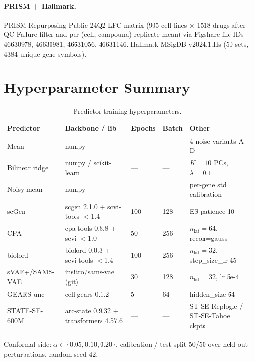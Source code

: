\documentclass{article}
\begin{document}
\paragraph{PRISM + Hallmark.} PRISM Repurposing Public 24Q2 LFC matrix (905 cell lines $\times$ 1518 drugs after QC-Failure filter and per-(cell, compound) replicate mean) via Figshare file IDs 46630978, 46630981, 46631056, 46631146. Hallmark MSigDB v2024.1.Hs (50 sets, 4384 unique gene symbols).

\section{Hyperparameter Summary}
\label{app:hparams}

\begin{table}[h]
\caption{Predictor training hyperparameters.}
\label{tab:hparams}
\centering
\small
\begin{tabular}{lllll}
\toprule
Predictor       & Backbone / lib                   & Epochs   & Batch & Other \\
\midrule
Mean            & numpy                            & ---      & ---   & 4 noise variants A--D \\
Bilinear ridge  & numpy / scikit-learn             & ---      & ---   & $K = 10$ PCs, $\lambda = 0.1$ \\
Noisy mean      & numpy                            & ---      & ---   & per-gene std calibration \\
scGen           & scgen 2.1.0 + scvi-tools $<$1.4  & 100      & 128   & ES patience 10 \\
CPA             & cpa-tools 0.8.8 + scvi $<$1.0    & 50       & 256   & $n_{\text{lat}} = 64$, recon=gauss \\
biolord         & biolord 0.0.3 + scvi-tools $<$1.4 & 100     & 256   & $n_{\text{lat}} = 32$, step\_size\_lr 45 \\
sVAE+/SAMS-VAE  & insitro/sams-vae (git)           & 30       & 128   & $n_{\text{lat}} = 32$, lr 5e-4 \\
GEARS-unc       & cell-gears 0.1.2                 & 5        & 64    & hidden\_size 64 \\
STATE-SE-600M   & arc-state 0.9.32 + transformers 4.57.6 & --- & --- & ST-SE-Replogle / ST-SE-Tahoe ckpts \\
\bottomrule
\end{tabular}
\end{table}

Conformal-side: $\alpha \in \{0.05, 0.10, 0.20\}$, calibration / test split 50/50 over held-out perturbations, random seed $42$.
\end{document}
